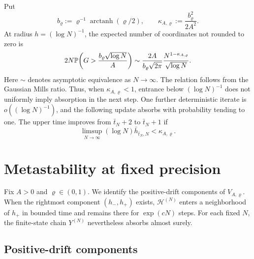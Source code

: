 \documentclass[11pt,reqno,a4paper]{article}
\newcommand{\Pp}{\P}
\DeclareMathOperator{\arctanh}{arctanh}
\begin{document}
\begin{remark}
\label{rem:subcritical-bounded-window-mechanism}
  Put
  \begin{equation*}
    b_\varrho:=\varrho^{-1}\arctanh(\varrho/2),
    \qquad
    \kappa_{A,\varrho}:=\frac{b_\varrho^2}{2A^2}.
  \end{equation*}
  At radius $h=(\log N)^{-1}$, the expected number of coordinates not rounded
  to zero is
  \begin{equation*}
    2N\Pp\left(G>\frac{b_\varrho\sqrt{\log N}}A\right)
    \sim
    \frac{2A}{b_\varrho\sqrt{2\pi}}
    \frac{N^{1-\kappa_{A,\varrho}}}{\sqrt{\log N}}.
  \end{equation*}
  Here $\sim$ denotes asymptotic equivalence as $N\to\infty$. The relation
  follows from the Gaussian Mills ratio.
  Thus, when $\kappa_{A,\varrho}<1$, entrance below $(\log N)^{-1}$ does not
  uniformly imply absorption in the next step. One further deterministic
  iterate is $o((\log N)^{-1})$, and the following update absorbs with
  probability tending to one. The upper time improves from $\bar t_N+2$ to
  $\bar t_N+1$ if
  \begin{equation*}
    \limsup_{N\to\infty}
    (\log N)\bar h_{\bar t_N,N}
    <
    \kappa_{A,\varrho}.
  \end{equation*}
\end{remark}

\section{Metastability at fixed precision}
\label{sec:rounded-metastability}

Fix $A>0$ and $\varrho\in(0,1)$. We identify the positive-drift components of
$V_{A,\varrho}$. When the rightmost component $(h_-,h_+)$ exists,
$\mathscr H^{(N)}$ enters a neighborhood of $h_+$ in bounded time and remains
there for $\exp(cN)$ steps. For each fixed $N$, the finite-state chain
$Y^{(N)}$ nevertheless absorbs almost surely.

\subsection{Positive-drift components}
\label{subsec:metastable-positive-rounded-wells}
\end{document}
